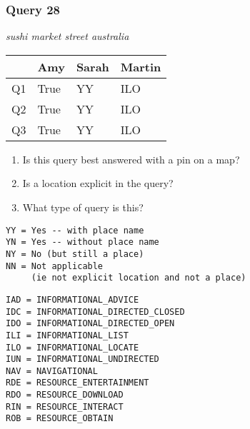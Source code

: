 \begin{frame}[fragile]
\frametitle{Query 28}
\vspace{1em}

\emph{sushi market street australia}

\vfill

\begin{table}
  \centering
  \begin{tabular}{ l l l l }
    & \textbf{Amy} & \textbf{Sarah} & \textbf{Martin}\\
    \toprule
    Q1 & True & YY & ILO\\
Q2 & True & YY & ILO\\
Q3 & True & YY & ILO\\
    \bottomrule
  \end{tabular}
\end{table}

\vfill

\tiny{

\begin{enumerate}
\item Is this query best answered with a pin on a map?
\item Is a location explicit in the query?
\item What type of query is this?
\end{enumerate}

\vfill

\begin{multicols}{2}
\begin{verbatim}
YY = Yes -- with place name
YN = Yes -- without place name
NY = No (but still a place)
NN = Not applicable 
     (ie not explicit location and not a place)
\end{verbatim}

\columnbreak
\begin{verbatim}
IAD = INFORMATIONAL_ADVICE
IDC = INFORMATIONAL_DIRECTED_CLOSED
IDO = INFORMATIONAL_DIRECTED_OPEN
ILI = INFORMATIONAL_LIST
ILO = INFORMATIONAL_LOCATE
IUN = INFORMATIONAL_UNDIRECTED
NAV = NAVIGATIONAL
RDE = RESOURCE_ENTERTAINMENT
RDO = RESOURCE_DOWNLOAD
RIN = RESOURCE_INTERACT
ROB = RESOURCE_OBTAIN
\end{verbatim}
\end{multicols}
}

\end{frame}


